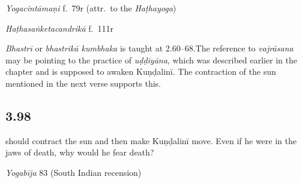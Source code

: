\begin{ekdosis}
\begin{testimonia}[hp03_097]
\emph{Yogacintāmaṇi} f.~79r (attr.~to the \emph{Haṭhayoga})
\begin{versinnote}
\end{versinnote}

\emph{Haṭhasaṅketacandrikā} f.~111r
\begin{versinnote}
\end{versinnote}
\end{testimonia}

\begin{philcomm}[hp03_097]
\emph{Bhastrī} or \emph{bhastrikā kumbhaka} is taught at 2.60–68.The reference to \emph{vajrāsana} may be pointing to the practice of \emph{uḍḍiyāna}, which was described earlier in the chapter and is supposed to awaken Kuṇḍalinī. The contraction of the sun mentioned in the next verse supports this.
\end{philcomm}


\subsection*{3.98}
\begin{translation} should contract the sun and then make Kuṇḍalinī move. Even if he were in the jaws of death, why would he fear death?%
\end{translation}


\begin{testimonia}[hp03_098]
\emph{Yogabīja} 83 (South Indian recension)
\begin{versinnote}
\tl{\var{mṛtyuvartma° ] mṛtyuvaktra°,  mṛtyuvajra°, mṛtyupadma° \vl}\\!}
\end{versinnote}


\end{testimonia}
\end{ekdosis}
